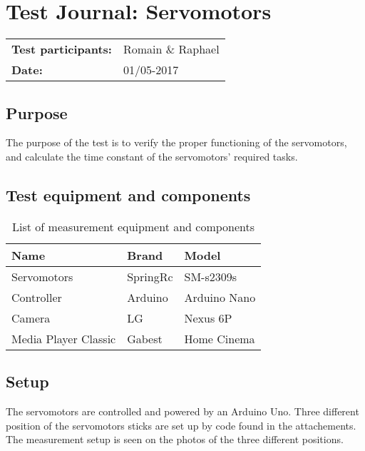 \graphicspath{{figures/design/}}


\chapter{Test Journal: Servomotors}
\label{ssc:Servomotors}

\begin{table}[!h]
\begin{tabular}{l l}
\textbf{Test participants:} & Romain \& Raphael   \\
\textbf{Date:}  & 01/05-2017
\end{tabular}
\end{table}

\section*{Purpose}
	
The purpose of the test is to verify the proper functioning of the servomotors, and calculate the time constant of the servomotors' required tasks.
	
\section*{Test equipment and components}


\begin{table}[htbp]
	\centering
	\caption{List of measurement equipment and components}\label{tab_appendix:Servo_equip2}
	
	\begin{tabularx}{\textwidth}{lXX}
		Name & Brand	& Model \\ \toprule 
		Servomotors	& SpringRc & SM-s2309s 	\\ \rowcolor{lightGrey}
		Controller	& Arduino & Arduino Nano \\ 
		Camera & LG & Nexus 6P \\ \rowcolor{lightGrey}
		Media Player Classic & Gabest & Home Cinema\\ 
	\end{tabularx}
\end{table}




	\section*{Setup}
	
The servomotors are controlled and powered by an Arduino Uno. Three different position of the servomotors sticks are set up by code found in the attachements. The measurement setup is seen on the photos of the three different positions. \

